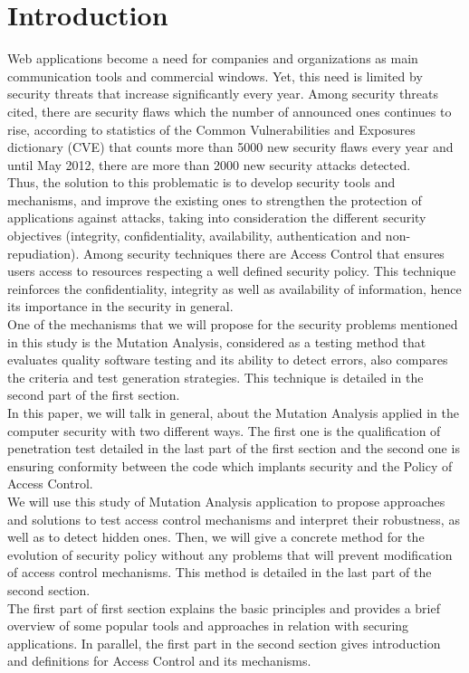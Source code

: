 \documentclass{acm_proc_article-sp}
\begin{document}
\section{Introduction}
Web applications become a need for companies and organizations as main communication tools and commercial windows. Yet, this need is limited by security threats that increase significantly every year. Among security threats cited, there are security flaws which the number of announced ones continues to rise, according to statistics of the Common Vulnerabilities and Exposures dictionary (CVE) that counts more than 5000 new security flaws every year and until May 2012, there are more than 2000 new security attacks detected.\\
Thus, the solution to this problematic is to develop security tools and mechanisms, and improve the existing ones to strengthen the protection of applications against attacks, taking into consideration the different security objectives (integrity, confidentiality, availability, authentication and non-repudiation). Among security techniques there are Access Control that ensures users access to resources respecting a well defined security policy. This technique reinforces the confidentiality, integrity as well as availability of information, hence its importance in the security in general.\\
One of the mechanisms that we will propose for the security problems mentioned in this study is the Mutation Analysis, considered as a testing method that evaluates quality software testing and its ability to detect errors, also compares the criteria and test generation strategies. This technique is detailed in the second part of the first section.\\
In this paper, we will talk in general, about the Mutation Analysis applied in the computer security with two different ways. The first one is the qualification of penetration test  detailed in the last part of the first section and the second one is ensuring conformity between the code which implants security and the Policy of Access Control.\\
We will use this study of Mutation Analysis application to propose approaches and solutions to test access control mechanisms and interpret their robustness, as well as to detect hidden ones. Then, we will give a concrete method for the evolution of security policy without any problems that will prevent modification of access control mechanisms. This method is detailed in the last part of the second section.\\
The first part of first section explains the basic principles and provides a brief overview of some popular tools and approaches in relation with securing applications. In parallel, the first part in the second section gives introduction and definitions for Access Control and its mechanisms.
\end{document}
